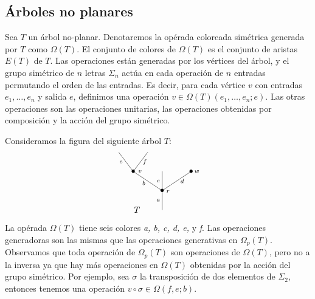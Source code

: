 \documentclass[../main.tex]{subfiles}
\begin{document}
\subsection{\'Arboles no planares}
\begin{defi}
    Sea $T$ un \'arbol no-planar. Denotaremos la op\'erada coloreada sim\'etrica generada por $T$ como $\Omega(T)$. El conjunto de colores de $\Omega(T)$ es el conjunto de aristas $E(T)$ de $T$.
    Las operaciones est\'an generadas por los v\'ertices del \'arbol, y el grupo sim\'etrico de $n$ letras $\Sigma_n$ act\'ua en cada operaci\'on de $n$ entradas permutando el orden de las entradas.
    Es decir, para cada v\'ertice $v$ con entradas $e_1,\dots,e_n$ y salida $e$, definimos una operaci\'on $v\in \Omega(T)(e_1,\dots,e_n;e)$. Las otras operaciones son las operaciones unitarias, las operaciones obtenidas por composici\'on y la acci\'on del grupo sim\'etrico.
\end{defi}
\begin{ex}
    Consideramos la figura del siguiente \'arbol $T$:
    \begin{equation}
        \xy
        <0.08cm, 0cm>:
        (0.0, 0.0)*{}="1"; %
        (0.0, 10.0)*=0{\bullet}="2"; %
        (-15.0, 20.0)*=0{\bullet}="3"; %
        (-22.5, 30.0)*{}="4"; %
        (-7.5, 30.0)*{}="5"; %
        (0.0, 20.0)*{}="6"; %
        (15.0, 20.0)*=0{\bullet}="7"; %
        "1";"2" **\dir{-};
        "2";"3" **\dir{-};
        "3";"4" **\dir{-};
        "3";"5" **\dir{-};
        "2";"6" **\dir{-};
        "2";"7" **\dir{-};
        (3.0, 9.5)*=0{\scriptstyle r};
        (-11.5, 20.0)*=0{\scriptstyle v};
        (-2.0, 5.0)*=0{\scriptstyle a};
        (-9.5, 14.0)*=0{\scriptstyle b};
        (-21.3, 25.0)*=0{\scriptstyle e};
        (-9, 25.0)*=0{\scriptstyle f};
        (-2.0, 15.0)*=0{\scriptstyle c};
        (10.4, 15.0)*=0{\scriptstyle d};
        (18.0, 20.0)*=0{\scriptstyle w};
        (-13,0)*{T};
        \endxy
    \end{equation}

    La op\'erada $\Omega(T)$ tiene seis colores \textit{a, b, c, d, e,} y \textit{f}. Las operaciones generadoras son las mismas que las operaciones generativas en $\Omega_p(T)$. Observamos que toda operaci\'on de $\Omega_p(T)$ son operaciones de $\Omega(T)$, pero no a la inversa ya que hay m\'as operaciones en $\Omega(T)$ obtenidas por la acci\'on del grupo sim\'etrico.
    Por ejemplo, sea $\sigma$ la transposici\'on de dos elementos de $\Sigma_2$, entonces tenemos una operaci\'on $v\circ\sigma\in\Omega(f,e;b)$.
\end{ex}
\end{document}
